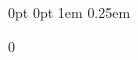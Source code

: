 

\DefineNewLength{\UWMad@Widest}         {0pt}        %
\DefineNewLength{\UWMad@WidestTest}     {0pt}        %
\DefineNewLength{\NomenclatureTitleSkip}{0em}        %
\DefineNewLength{\NomenclaturePrintSkip}{1em}        %
\DefineNewLength{\EntryMarginLeft}      {1em}
\DefineNewLength{\EntryMarginBottom}    {0.25em}

   {0}  %
\newcount\NomenclatureNestingLevel %
\newcount\NomenclatureSectioningLevel %

\newif\ifMakeNomenclatureStarred\MakeNomenclatureStarredtrue
\let\MakeNomenclatureStarred\MakeNomenclatureStarredtrue
\let\MakeNomenclatureNotStarred\MakeNomenclatureStarredfalse

\newcommand*{\UWMad@UpdateWidest}[1]{
    \settowidth{\UWMad@WidestTest}{#1}
    \ifdim\UWMad@Widest<\UWMad@WidestTest
        \setlength{\UWMad@Widest}{\UWMad@WidestTest}
    \fi
}
%
%
\newcommand{\TheNomenclatureName}{Nomenclature}
\newcommand{\NomenclatureName}[1]
    {\renewcommand{\TheNomenclatureName}{#1}}
%
\newcommand{\TheNomenclatureGroupName}{}
\newcommand{\NomenclatureGroupName}[1]
    {\renewcommand{\TheNomenclatureGroupName}{#1}}
%
%
\newcommand{\NomenclatureNameStyle}
    {\ifdefempty{\TheNomenclatureGroupName}%
        {}%
        {\ifMakeNomenclatureStarred%
            \csname\TheCurrentSectioningCommand\endcsname*%
                {\TheNomenclatureGroupName}%
            \UWMad@FrontMatterRegister%
                [\TheCurrentSectioningCommand]%
                {\TheNomenclatureGroupName}
         \else%
            \csname\TheCurrentSectioningCommand\endcsname%
                {\TheNomenclatureGroupName}%
         \fi}}
%
%
\newcommand{\TheCurrentSectioningCommand}{}
\newcommand{\CurrentSectioningCommand}[1]
    {\renewcommand{\TheCurrentSectioningCommand}{#1}}



